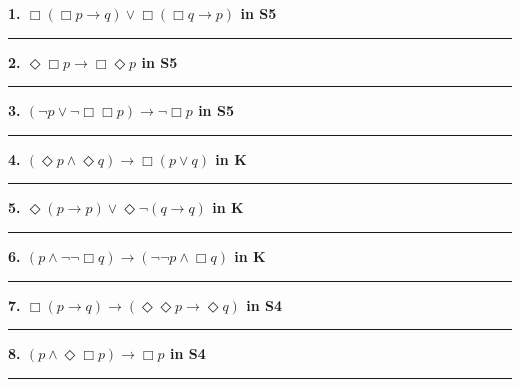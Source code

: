 \documentclass[12pt]{article}
\newcommand{\ruleheader}[1]{\medskip\noindent\textbf{\large #1}\par\smallskip\hrule\smallskip}
\begin{document}
\ruleheader{1. $\Box(\Box p \rightarrow q) \vee \Box(\Box q \rightarrow p)$ in \textbf{S5}}

\newpage
\ruleheader{2. $\Diamond \Box p \rightarrow \Box \Diamond p$ in \textbf{S5}}

\newpage
\ruleheader{3. $(\neg p \vee \neg \Box \Box p) \rightarrow \neg \Box p$ in \textbf{S5}}

\newpage
\ruleheader{4. $(\Diamond p \wedge \Diamond q) \rightarrow \Box(p \vee q)$ in \textbf{K}}

\newpage
\ruleheader{5. $\Diamond (p \rightarrow p) \vee \Diamond \neg (q \rightarrow q)$ in \textbf{K}}

\newpage
\ruleheader{6. $(p \wedge \neg \neg \Box q) \rightarrow (\neg \neg p \wedge \Box q)$ in \textbf{K}}

\newpage
\ruleheader{7. $\Box(p \rightarrow q) \rightarrow (\Diamond \Diamond p \rightarrow \Diamond q)$ in \textbf{S4}}

\newpage
\ruleheader{8. $(p \wedge \Diamond \Box p) \rightarrow \Box p$ in \textbf{S4}}
\end{document}
